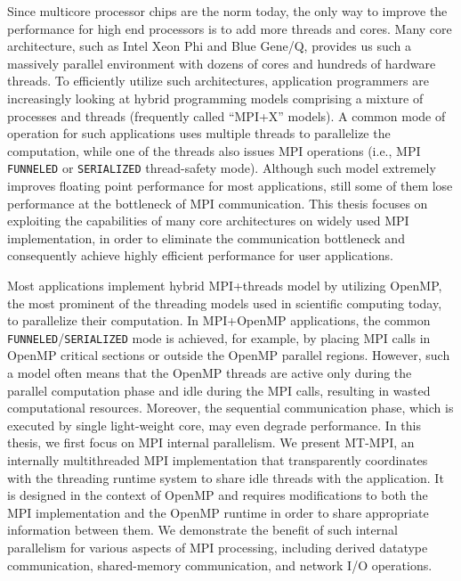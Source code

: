 Since multicore processor chips are the norm today, the only way to 
improve the performance for high end processors is to add more threads 
and cores. Many core architecture, such as Intel Xeon Phi and Blue Gene/Q, 
provides us such a massively parallel environment with dozens of cores and
hundreds of hardware threads. To efficiently utilize such architectures, 
application programmers are increasingly looking at hybrid programming 
models comprising a mixture of processes and threads (frequently called 
``MPI+X'' models). A common mode of operation for such applications 
uses multiple threads to parallelize the computation, while one of the 
threads also issues MPI operations (i.e., MPI \texttt{FUNNELED} or 
\texttt{SERIALIZED} thread-safety mode). Although such model extremely 
improves floating point performance for most applications, still 
some of them lose performance at the bottleneck of MPI communication.
This thesis focuses on exploiting the capabilities of many core 
architectures on widely used MPI implementation, in order to eliminate
the communication bottleneck and consequently achieve highly efficient 
performance for user applications.

Most applications implement hybrid MPI+threads model by 
utilizing OpenMP, the most prominent of the threading models used 
in scientific computing today, to parallelize their computation.
In MPI+OpenMP applications, the common \texttt{FUNNELED}\slash \texttt{SERIALIZED} 
mode is achieved, for example, by placing MPI calls in OpenMP critical 
sections or outside the OpenMP parallel regions. However, such a model 
often means that the OpenMP threads are active only during the parallel 
computation phase and idle during the MPI calls, resulting in wasted 
computational resources. Moreover, the sequential communication phase, 
which is executed by single light-weight core, may even degrade 
performance. 
In this thesis, we first focus on MPI internal parallelism. We present MT-MPI, an
internally multithreaded MPI implementation that transparently
coordinates with the threading runtime system to share idle threads
with the application. It is designed in the context of OpenMP and
requires modifications to both the MPI implementation and the OpenMP
runtime in order to share appropriate information between them. We
demonstrate the benefit of such internal parallelism for various
aspects of MPI processing, including derived datatype communication,
shared-memory communication, and network I/O operations.

